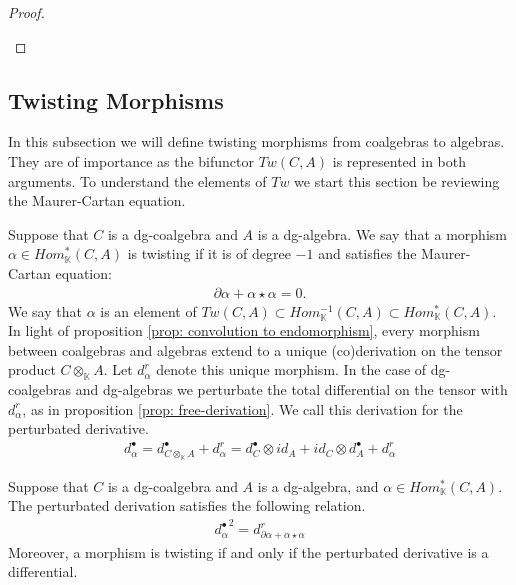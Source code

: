 \documentclass[../thesis.tex]{subfiles}
\begin{document}
\begin{proof}
\begin{center}
                \end{center}

            \end{proof}

        \subsection{Twisting Morphisms}

            In this subsection we will define twisting morphisms from coalgebras to algebras. They are of importance as the bifunctor $Tw(C,A)$ is represented in both arguments. To understand the elements of $Tw$ we start this section be reviewing the Maurer-Cartan equation.

            Suppose that $C$ is a dg-coalgebra and $A$ is a dg-algebra. We say that a morphism $\alpha\in Hom_\mathbb{K}^*(C,A)$ is twisting if it is of degree $-1$ and satisfies the Maurer-Cartan equation:
            \begin{align*}
                \partial\alpha + \alpha\star\alpha = 0\text{.}
            \end{align*}
            We say that $\alpha$ is an element of $Tw(C,A)\subset Hom_\mathbb{K}^{-1}(C,A)\subset Hom_\mathbb{K}^*(C,A)$. In light of proposition \ref{prop: convolution to endomorphism}, every morphism between coalgebras and algebras extend to a unique (co)derivation on the tensor product $C\otimes_\mathbb{K}A$. Let $d_\alpha^r$ denote this unique morphism. In the case of dg-coalgebras and dg-algebras we perturbate the total differential on the tensor with $d_\alpha^r$, as in proposition \ref{prop: free-derivation}. We call this derivation for the perturbated derivative.
            \begin{align*}
                d_\alpha^\bullet = d_{C\otimes_\mathbb{K}A}^\bullet + d_\alpha^r = d_C^\bullet\otimes id_A + id_C\otimes d_A^\bullet + d_\alpha^r
            \end{align*}
            \begin{proposition}\label{prop: twisted-differential}
                Suppose that $C$ is a dg-coalgebra and $A$ is a dg-algebra, and $\alpha\in Hom_\mathbb{K}^*(C,A)$. The perturbated derivation satisfies the following relation.
                \begin{align*}
                    {d^\bullet_\alpha}^2 = d^r_{\partial \alpha + \alpha\star\alpha}
                \end{align*}
                Moreover, a morphism is twisting if and only if the perturbated derivative is a differential.
            \end{proposition}
\end{document}
